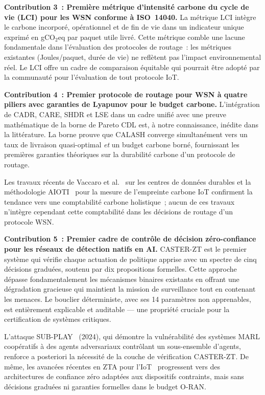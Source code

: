 \textbf{Contribution 3~: Première métrique d'intensité carbone du cycle de vie (LCI) pour les WSN conforme à ISO~14040.}
La métrique LCI intègre le carbone incorporé, opérationnel et de fin de vie dans un indicateur unique exprimé en gCO$_2$eq par paquet utile livré. Cette métrique comble une lacune fondamentale dans l'évaluation des protocoles de routage~: les métriques existantes (Joules/paquet, durée de vie) ne reflètent pas l'impact environnemental réel. Le LCI offre un cadre de comparaison équitable qui pourrait être adopté par la communauté pour l'évaluation de tout protocole IoT.

\textbf{Contribution 4~: Premier protocole de routage pour WSN à quatre piliers avec garanties de Lyapunov pour le budget carbone.}
L'intégration de CADR, CARE, SHDR et LSE dans un cadre unifié avec une preuve mathématique de la borne de Pareto CDL est, à notre connaissance, inédite dans la littérature. La borne prouve que CALASH converge simultanément vers un taux de livraison quasi-optimal \emph{et} un budget carbone borné, fournissant les premières garanties théoriques sur la durabilité carbone d'un protocole de routage.

Les travaux récents de Vaccaro et al.~\cite{vaccaro_sustainable2025} sur les centres de données durables et la méthodologie AIOTI~\cite{aioti2024carbon} pour la mesure de l'empreinte carbone IoT confirment la tendance vers une comptabilité carbone holistique~; aucun de ces travaux n'intègre cependant cette comptabilité dans les décisions de routage d'un protocole WSN.

\textbf{Contribution 5~: Premier cadre de contrôle de décision zéro-confiance pour les réseaux de détection natifs en AI.}
CASTER-ZT est le premier système qui vérifie chaque actuation de politique apprise avec un spectre de cinq décisions graduées, soutenu par dix propositions formelles. Cette approche dépasse fondamentalement les mécanismes binaires existants en offrant une dégradation gracieuse qui maintient la mission de surveillance tout en contenant les menaces. Le bouclier déterministe, avec ses 14 paramètres non apprenables, est entièrement explicable et auditable --- une propriété cruciale pour la certification de systèmes critiques.

L'attaque SUB-PLAY~\cite{subplay_marl2025} (2024), qui démontre la vulnérabilité des systèmes MARL coopératifs à des agents adversariaux contrôlant un sous-ensemble d'agents, renforce a posteriori la nécessité de la couche de vérification CASTER-ZT. De même, les avancées récentes en ZTA pour l'IoT~\cite{shakya_zt_iot2025, kaur_zta_iot2024} progressent vers des architectures de confiance zéro adaptées aux dispositifs contraints, mais sans décisions graduées ni garanties formelles dans le budget O-RAN.

